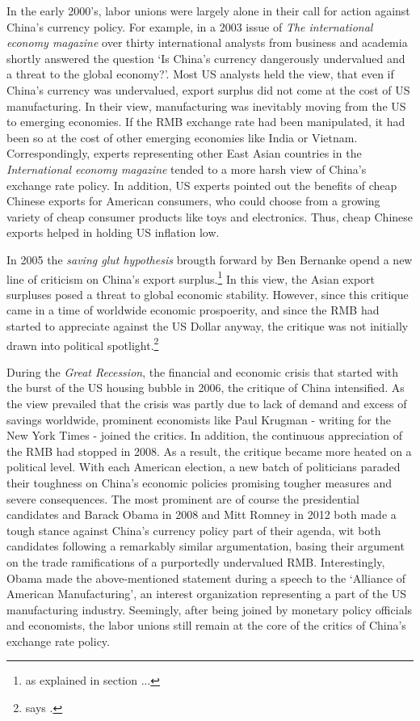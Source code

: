 In the early 2000's, labor unions were largely alone in their call for action against China's currency policy. For example, in a 2003 issue of \emph{The international economy magazine} over thirty international analysts from business and academia shortly answered the question `Is China's currency dangerously undervalued and a threat to the global economy?'.%
Most US analysts held the view, that even if China's currency was undervalued, export surplus did not come at the cost of US manufacturing. In their view, manufacturing was inevitably moving from the US to emerging economies. If the RMB exchange rate had been manipulated, it had been so at the cost of other emerging economies like India or Vietnam. Correspondingly, experts representing other East Asian countries in the \emph{International economy magazine} tended to a more harsh view of China's exchange rate policy. In addition, US experts pointed out the benefits of cheap Chinese exports for American consumers, who could choose from a growing variety of cheap consumer products like toys and electronics. Thus, cheap Chinese exports helped in holding US inflation low.

In 2005 the \emph{saving glut hypothesis} brougth forward by Ben Bernanke opend a new line of criticism on China's export surplus.\footnote{as explained in section ...} %
In this view, the Asian export surpluses posed a threat to global economic stability. However, since this critique came in a time of worldwide economic prospoerity, and since the RMB had started to appreciate against the US Dollar anyway, the critique was not initially drawn into political spotlight.\footnote{says \cite[p.16]{Levy2010}.}

During the \emph{Great Recession}, the financial and economic crisis that started with the burst of the US housing bubble in 2006, the critique of China intensified. As the view prevailed that the crisis was partly due to lack of demand and excess of savings worldwide, prominent economists like Paul Krugman - writing for the New York Times - joined the critics. In addition, the continuous appreciation of the RMB had stopped in 2008. As a result, the critique became more heated on a political level. With each American election, a new batch of politicians paraded their 
toughness on China's economic policies promising tougher measures and 
severe consequences. The most prominent are of course the presidential candidates and  Barack Obama in 
2008\cite{Obama2008} and Mitt Romney in 2012\cite{Romney2012} both made a tough stance against China's currency policy part of their agenda, wit both candidates following a remarkably similar argumentation, basing their argument on the trade ramifications of a 
purportedly undervalued RMB. Interestingly, Obama made the above-mentioned statement during a speech to the `Alliance of American 
Manufacturing', an interest organization representing a part of the US 
manufacturing industry. Seemingly, after being joined by monetary policy officials and economists, the labor unions still remain at the core of the critics of China's exchange rate policy.


